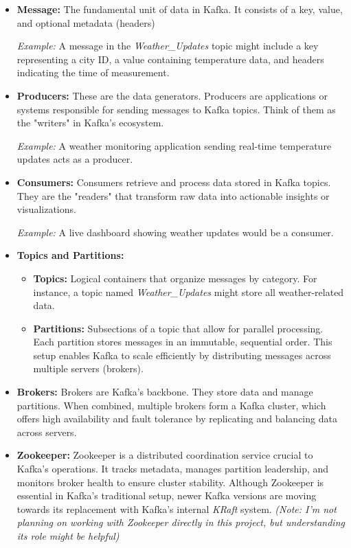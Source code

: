 \documentclass[10pt , a4paper]{report}
\begin{document}
\begin{itemize}
    \item \textbf{Message:} The fundamental unit of data in Kafka. It consists of a key, value, and optional metadata (headers)
    
    \textit{Example:} A message in the \textit{Weather\_Updates} topic might include a key representing a city ID, a value containing temperature data, and headers indicating the time of measurement.
    
    \item \textbf{Producers:}  
    These are the data generators. Producers are applications or systems responsible for sending messages to Kafka topics. Think of them as the "writers" in Kafka's ecosystem. 
    
    \textit{Example:} A weather monitoring application sending real-time temperature updates acts as a producer.

    \item \textbf{Consumers:}  
    Consumers retrieve and process data stored in Kafka topics. They are the "readers" that transform raw data into actionable insights or visualizations.  
    
    \textit{Example:} A live dashboard showing weather updates would be a consumer.

    \item \textbf{Topics and Partitions:}  
    \begin{itemize}
        \item \textbf{Topics:} Logical containers that organize messages by category. For instance, a topic named \textit{Weather\_Updates} might store all weather-related data.
        \item \textbf{Partitions:} Subsections of a topic that allow for parallel processing. Each partition stores messages in an immutable, sequential order. This setup enables Kafka to scale efficiently by distributing messages across multiple servers (brokers).
    \end{itemize}

    \item \textbf{Brokers:}  
    Brokers are Kafka's backbone. They store data and manage partitions. When combined, multiple brokers form a Kafka cluster, which offers high availability and fault tolerance by replicating and balancing data across servers.

    \item \textbf{Zookeeper:}  
    Zookeeper is a distributed coordination service crucial to Kafka's operations. It tracks metadata, manages partition leadership, and monitors broker health to ensure cluster stability. Although Zookeeper is essential in Kafka’s traditional setup, newer Kafka versions are moving towards its replacement with Kafka's internal \textit{KRaft} system.  
    \textit{(Note: I'm not planning on working with Zookeeper directly in this project, but understanding its role might be helpful)}
\end{itemize}
\end{document}
